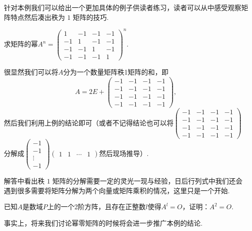 \begin{enumerate}
          针对本例我们可以给出一个更加具体的例子供读者练习，读者可以从中感受观察矩阵特点然后凑出秩为 $1$ 矩阵的技巧.
          \begin{example}{}{}
              求矩阵的幂$A^n=\begin{pmatrix}
                      1  & -1 & -1 & -1 \\
                      -1 & 1  & -1 & -1 \\
                      -1 & -1 & 1  & -1 \\
                      -1 & -1 & -1 & 1
                  \end{pmatrix}^n$.
          \end{example}
          \begin{solution}
              很显然我们可以将$A$分为一个数量矩阵秩1矩阵的和，即\[A=2E+\begin{pmatrix}
                      -1 & -1 & -1 & -1 \\
                      -1 & -1 & -1 & -1 \\
                      -1 & -1 & -1 & -1 \\
                      -1 & -1 & -1 & -1
                  \end{pmatrix},\]
              然后我们利用上例的结论即可（或者不记得结论也可以将$\begin{pmatrix}
                      -1 & -1 & -1 & -1 \\
                      -1 & -1 & -1 & -1 \\
                      -1 & -1 & -1 & -1 \\
                      -1 & -1 & -1 & -1
                  \end{pmatrix}$分解成$\begin{pmatrix}
                      -1 \\ -1 \\ \vdots \\ -1
                  \end{pmatrix}\begin{pmatrix}
                      1 & 1 & \cdots & 1
                  \end{pmatrix}$然后现场推导）.
          \end{solution}

          解答中看出秩 $1$ 矩阵的分解需要一定的灵光一现与经验，日后行列式中我们还会遇到很多需要将矩阵分解为两个向量或矩阵乘积的情况，这里只是一个开始.

          \begin{example}{}{}
              已知$A$是数域$P$上的一个2阶方阵，且存在正整数$l$使得$A^l=O$，证明：$A^2=O$.
          \end{example}
          事实上，将来我们讨论幂零矩阵的时候将会进一步推广本例的结论.


\end{enumerate}
